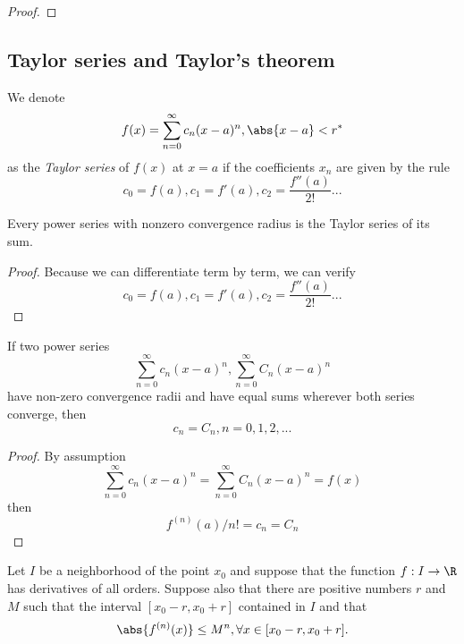 \begin{refsection}
\begin{proof}
\end{proof}

\subsection{Taylor series and Taylor's theorem}
\begin{definition}
	\cite[428]{kaplan1973advanced}
	We denote
	$$f(x) = \sum_{n=0}^\infty c_n(x-a)^n, \abs{x-a} < r^*$$
	as the \emph{Taylor series} of $f(x)$ at $x=a$ if the coefficients $x_n$ are given by the rule
	$$c_0 = f(a),c_1 = f'(a),c_2 = \frac{f''(a)}{2!} ...$$
\end{definition}


\begin{lemma}
	Every power series with nonzero convergence radius is the Taylor series of its sum.
\end{lemma}
\begin{proof}
	Because we can differentiate term by term, we can verify
	$$c_0 = f(a),c_1 = f'(a),c_2 = \frac{f''(a)}{2!} ...$$
\end{proof}



\begin{lemma}
	\cite[429]{kaplan1973advanced}
	If two power series
	$$\sum_{n=0}^\infty c_n(x-a)^n,\sum_{n=0}^\infty C_n(x-a)^n$$
	have non-zero convergence radii and have equal sums wherever both series converge, then
	$$c_n = C_n, n=0,1,2,...$$
\end{lemma}
\begin{proof}
	By assumption
	$$\sum_{n=0}^\infty c_n(x-a)^n=\sum_{n=0}^\infty C_n(x-a)^n = f(x)$$
	then
	$$f^{(n)}(a)/n! = c_n = C_n$$
\end{proof}

\begin{theorem}
	Let $I$ be a neighborhood of the point $x_0$ and suppose that the function $f:I\to \R$ has derivatives of all orders. Suppose also that there are positive numbers $r$ and $M$ such that the interval $[x_0-r,x_0+r]$ contained in $I$ and that
	$$\abs{f^{(n)}(x)}\leq M^n, \forall x\in [x_0-r,x_0+r].$$
	

\end{theorem}
\end{refsection}
